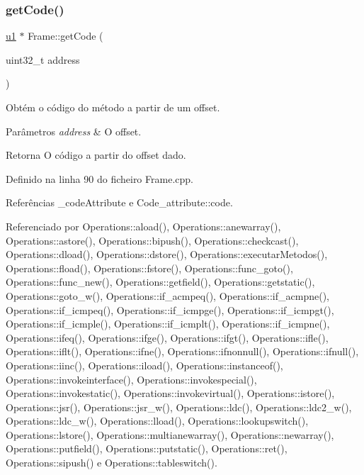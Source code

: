 \subsubsection{\texorpdfstring{get\+Code()}{getCode()}}
{\footnotesize\ttfamily \hyperlink{BasicTypes_8h_ad9f4cdb6757615aae2fad89dab3c5470}{u1} $\ast$ Frame\+::get\+Code (\begin{DoxyParamCaption}\item[{uint32\+\_\+t}]{address }\end{DoxyParamCaption})}



Obtém o código do método a partir de um offset. 


\begin{DoxyParams}{Parâmetros}
{\em address} & O offset. \\
\hline
\end{DoxyParams}
\begin{DoxyReturn}{Retorna}
O código a partir do offset dado. 
\end{DoxyReturn}


Definido na linha 90 do ficheiro Frame.\+cpp.



Referências \+\_\+code\+Attribute e Code\+\_\+attribute\+::code.



Referenciado por Operations\+::aload(), Operations\+::anewarray(), Operations\+::astore(), Operations\+::bipush(), Operations\+::checkcast(), Operations\+::dload(), Operations\+::dstore(), Operations\+::executar\+Metodos(), Operations\+::fload(), Operations\+::fstore(), Operations\+::func\+\_\+goto(), Operations\+::func\+\_\+new(), Operations\+::getfield(), Operations\+::getstatic(), Operations\+::goto\+\_\+w(), Operations\+::if\+\_\+acmpeq(), Operations\+::if\+\_\+acmpne(), Operations\+::if\+\_\+icmpeq(), Operations\+::if\+\_\+icmpge(), Operations\+::if\+\_\+icmpgt(), Operations\+::if\+\_\+icmple(), Operations\+::if\+\_\+icmplt(), Operations\+::if\+\_\+icmpne(), Operations\+::ifeq(), Operations\+::ifge(), Operations\+::ifgt(), Operations\+::ifle(), Operations\+::iflt(), Operations\+::ifne(), Operations\+::ifnonnull(), Operations\+::ifnull(), Operations\+::iinc(), Operations\+::iload(), Operations\+::instanceof(), Operations\+::invokeinterface(), Operations\+::invokespecial(), Operations\+::invokestatic(), Operations\+::invokevirtual(), Operations\+::istore(), Operations\+::jsr(), Operations\+::jsr\+\_\+w(), Operations\+::ldc(), Operations\+::ldc2\+\_\+w(), Operations\+::ldc\+\_\+w(), Operations\+::lload(), Operations\+::lookupswitch(), Operations\+::lstore(), Operations\+::multianewarray(), Operations\+::newarray(), Operations\+::putfield(), Operations\+::putstatic(), Operations\+::ret(), Operations\+::sipush() e Operations\+::tableswitch().

